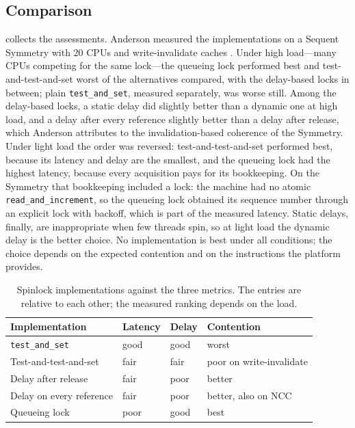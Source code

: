 \documentclass[../main.tex]{subfiles}
\begin{document}
\subsection{Comparison}

 collects the assessments.  Anderson measured
the implementations on a Sequent Symmetry with 20 CPUs and
write-invalidate caches \cite{anderson1990}.  Under high load---many CPUs
competing for the same lock---the queueing lock performed best and
test-and-test-and-set worst of the alternatives compared, with the
delay-based locks in between; plain \texttt{test\_and\_set}, measured
separately, was worse still.  Among the delay-based locks, a static delay
did slightly better than a dynamic one at high load, and a delay after
every reference slightly better than a delay after release, which Anderson
attributes to the invalidation-based coherence of the Symmetry.  Under
light load the order was reversed: test-and-test-and-set performed best,
because its latency and delay are the smallest, and the queueing lock had
the highest latency, because every acquisition pays for its bookkeeping.
On the Symmetry that bookkeeping included a lock: the machine had no atomic
\texttt{read\_and\_increment}, so the queueing lock obtained its sequence
number through an explicit lock with backoff, which is part of the
measured latency.  Static delays, finally, are inappropriate when few
threads spin, so at light load the dynamic delay is the better choice.  No
implementation is best under all conditions; the choice depends on the
expected contention and on the instructions the platform
provides.

\begin{table}[htbp]
  \centering
  \caption{Spinlock implementations against the three metrics.  The
    entries are relative to each other; the measured ranking depends on the
    load.}
  \label{tab:l10-spin-compare}
  \small
  \begin{tabular}{@{}llll@{}}
    \toprule
    Implementation & Latency & Delay & Contention \\
    \midrule
    \texttt{test\_and\_set}  & good & good & worst \\
    Test-and-test-and-set    & fair & fair & poor on write-invalidate \\
    Delay after release      & fair & poor & better \\
    Delay on every reference & fair & poor & better, also on NCC \\
    Queueing lock            & poor & good & best \\
    \bottomrule
  \end{tabular}
\end{table}
\end{document}
